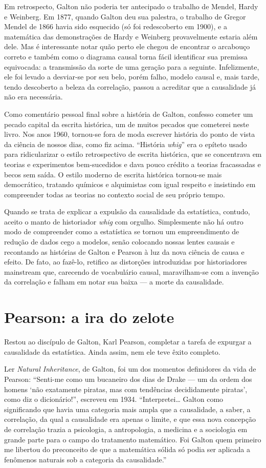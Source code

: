 \documentclass[11pt,a5paper,twoside]{book}
\begin{document}
Em retrospecto, Galton não poderia ter antecipado o trabalho de Mendel, Hardy e Weinberg. Em 1877, quando Galton deu sua palestra, o trabalho de Gregor Mendel de 1866 havia sido esquecido (só foi redescoberto em 1900), e a matemática das demonstrações de Hardy e Weinberg provavelmente estaria além dele. Mas é interessante notar quão perto ele chegou de encontrar o arcabouço correto e também como o diagrama causal torna fácil identificar sua premissa equivocada: a transmissão da sorte de uma geração para a seguinte. Infelizmente, ele foi levado a desviar-se por seu belo, porém falho, modelo causal e, mais tarde, tendo descoberto a beleza da correlação, passou a acreditar que a causalidade já não era necessária.

Como comentário pessoal final sobre a história de Galton, confesso cometer um pecado capital da escrita histórica, um de muitos pecados que cometerei neste livro. Nos anos 1960, tornou-se fora de moda escrever história do ponto de vista da ciência de nossos dias, como fiz acima. “História \textit{whig}” era o epíteto usado para ridicularizar o estilo retrospectivo de escrita histórica, que se concentrava em teorias e experimentos bem-sucedidos e dava pouco crédito a teorias fracassadas e becos sem saída. O estilo moderno de escrita histórica tornou-se mais democrático, tratando químicos e alquimistas com igual respeito e insistindo em compreender todas as teorias no contexto social de seu próprio tempo.

Quando se trata de explicar a expulsão da causalidade da estatística, contudo, aceito o manto de historiador \textit{whig} com orgulho. Simplesmente não há outro modo de compreender como a estatística se tornou um empreendimento de redução de dados cego a modelos, senão colocando nossas lentes causais e recontando as histórias de Galton e Pearson à luz da nova ciência de causa e efeito. De fato, ao fazê-lo, retifico as distorções introduzidas por historiadores mainstream que, carecendo de vocabulário causal, maravilham-se com a invenção da correlação e falham em notar sua baixa — a morte da causalidade.

\section{Pearson: a ira do zelote}
Restou ao discípulo de Galton, Karl Pearson, completar a tarefa de expurgar a causalidade da estatística. Ainda assim, nem ele teve êxito completo.

Ler \textit{Natural Inheritance}, de Galton, foi um dos momentos definidores da vida de Pearson: “Senti-me como um bucaneiro dos dias de Drake — um da ordem dos homens ‘não exatamente piratas, mas com tendências decididamente piratas’, como diz o dicionário!”, escreveu em 1934. “Interpretei… Galton como significando que havia uma categoria mais ampla que a causalidade, a saber, a correlação, da qual a causalidade era apenas o limite, e que essa nova concepção de correlação trazia a psicologia, a antropologia, a medicina e a sociologia em grande parte para o campo do tratamento matemático. Foi Galton quem primeiro me libertou do preconceito de que a matemática sólida só podia ser aplicada a fenômenos naturais sob a categoria da causalidade.”
\end{document}

